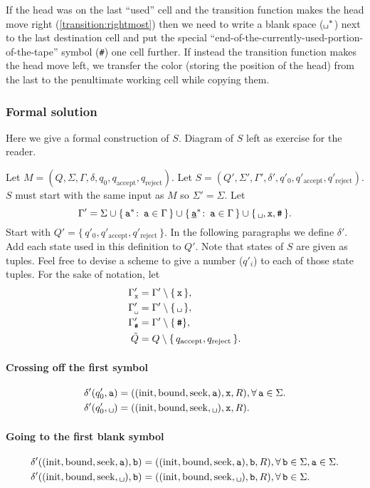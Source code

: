 \documentclass{article}
\newcommand{\obullet}[1]{\ensuremath{#1^*}}
\newcommand{\0}{\texttt{\textvisiblespace}}
\newcommand{\°}{\obullet{\0}}
\newcommand{\A}{\obullet{\s}}
\newcommand{\HA}{\obullet{\underline{\s}}}
\newcommand{\s}{\texttt{a}}
\newcommand{\w}{\texttt{b}}
\newcommand{\X}{\texttt{x}}
\newcommand{\e}{\texttt{\#}}
\newcommand{\st}{\colon\,}
\newcommand{\qa}{q_\text{accept}}
\newcommand{\qr}{q_\text{reject}}
\newcommand{\qpz}{q'_0}
\newcommand{\qpa}{q'_\text{accept}}
\newcommand{\qpr}{q'_\text{reject}}
\newcommand{\gpwb}{\Gamma'_{\0{}}}
\newcommand{\gpwx}{\Gamma'_{\X{}}}
\newcommand{\gpwe}{\Gamma'_{\e{}}}
\newcommand{\qwar}{\tilde{Q}}
\begin{document}
If the head was on the last ``used'' cell and the transition function makes
the head move right (\ref{transition:rightmost}) then we need to write a blank space (\°{}) next to the
last destination
cell and put the special
``end-of-the-currently-used-portion-of-the-tape'' symbol (\e)
one cell further. If instead the transition function makes the head move left,
we transfer the color (storing the position of the head) from the last
to the penultimate working cell while copying them.

\subsubsection{Formal solution}
Here we give a formal construction of $S$.
Diagram of $S$ left as exercise for the reader.

Let $M=(Q,\Sigma,\Gamma,\delta,q_0,q_{\text{accept}},q_{\text{reject}})$.
Let $S=(Q',\Sigma',\Gamma',\delta',\qpz,\qpa,\qpr)$.
$S$ must start with the same input as $M$ so $\Sigma'=\Sigma$. Let
$$\Gamma' = \Sigma \cup \{\,\A \st \s \in \Gamma\,\} \cup
\{\,\HA \st \s \in \Gamma\,\} \cup \{\,\0{}, \X, \e\,\}.$$
Start with $Q' = \{\,\qpz,\qpa,\qpr\,\}$. In the following paragraphs we define
$\delta'$. Add each state used in this definition to $Q'$.
Note that states of $S$ are given as tuples. Feel free to devise a scheme to
give a number ($q'_i$) to each of those state tuples.
For the sake of notation, let
\begin{align*}
  \gpwx &= \Gamma' \setminus\{\,\X\,\},\\
  \gpwb &= \Gamma' \setminus\{\,\0{}\,\},\\
  \gpwe &= \Gamma' \setminus\{\,\e\},\\
  \qwar &= Q\setminus\{\,\qa,\qr\,\}.
\end{align*}

\paragraph{Crossing off the first symbol}
\begin{align}
  \delta'(\qpz,\s)
  &= ((\text{init},\text{bound}, \text{seek}, \s), \X, R),
  \forall\, \s \in \Sigma.\\
  \delta'(\qpz,\0{})
  &= ((\text{init},\text{bound}, \text{seek}, \0{}), \X, R).
\end{align}

\paragraph{Going to the first blank symbol}
\begin{align}
  \delta'((\text{init},\text{bound}, \text{seek}, \s), \w)
  &= ((\text{init},\text{bound}, \text{seek}, \s), \w, R),
  \forall\,
  \w \in \Sigma,
  \s \in \Sigma.\\
  \delta'((\text{init},\text{bound}, \text{seek}, \0{}), \w)
  &= ((\text{init},\text{bound}, \text{seek}, \0{}), \w, R),
  \forall\, \w \in \Sigma.
\end{align}
\end{document}
